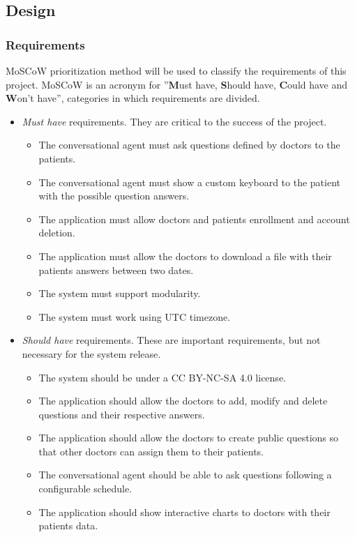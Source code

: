 \documentclass[12pt,english]{article}
\begin{document}
\subsection{Design}

\subsubsection{Requirements}
MoSCoW prioritization method \cite{moscow} will be used to classify the requirements of this project. MoSCoW is an acronym for ''\textbf{M}ust have, \textbf{S}hould have, \textbf{C}ould have and \textbf{W}on't have'', categories in which requirements are divided.
\begin{itemize}
  \item \emph{Must have} requirements. They are critical to the success of the project.
    \begin{itemize}
      \item The conversational agent must ask questions defined by doctors to the patients.
      \item The conversational agent must show a custom keyboard to the patient with the possible question answers.
      \item The application must allow doctors and patients enrollment and account deletion.
      \item The application must allow the doctors to download a file with their patients answers between two dates.
      \item The system must support modularity.
      \item The system must work using UTC timezone.
    \end{itemize}
  \item \emph{Should have} requirements. These are important requirements, but not necessary for  the system release.
    \begin{itemize}
      \item The system should be under a CC BY-NC-SA 4.0 \cite{CC} license.
      \item The application should allow the doctors to add, modify and delete questions and their respective answers.
      \item The application should allow the doctors to create public questions so that other doctors can assign them to their patients.
      \item The conversational agent should be able to ask questions following a configurable schedule.
      \item The application should show interactive charts to doctors with their patients data.

\end{itemize}
\end{itemize}
\end{document}
